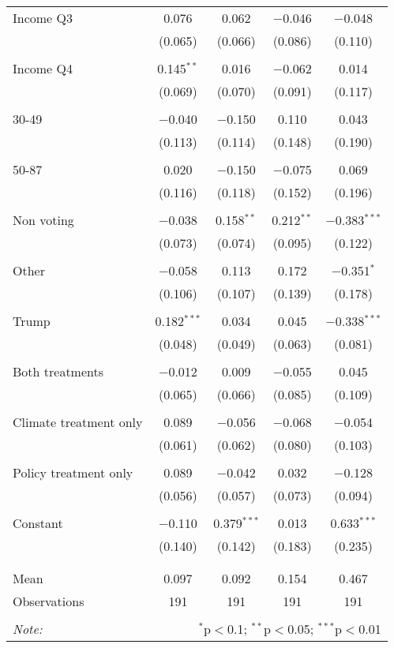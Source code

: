 \begin{tabular}{@{\extracolsep{5pt}}lcccc}
 Income Q3 & 0.076 & 0.062 & $-$0.046 & $-$0.048 \\ 
  & (0.065) & (0.066) & (0.086) & (0.110) \\ 
  & & & & \\ 
 Income Q4 & 0.145$^{**}$ & 0.016 & $-$0.062 & 0.014 \\ 
  & (0.069) & (0.070) & (0.091) & (0.117) \\ 
  & & & & \\ 
 30-49 & $-$0.040 & $-$0.150 & 0.110 & 0.043 \\ 
  & (0.113) & (0.114) & (0.148) & (0.190) \\ 
  & & & & \\ 
 50-87 & 0.020 & $-$0.150 & $-$0.075 & 0.069 \\ 
  & (0.116) & (0.118) & (0.152) & (0.196) \\ 
  & & & & \\ 
 Non voting & $-$0.038 & 0.158$^{**}$ & 0.212$^{**}$ & $-$0.383$^{***}$ \\ 
  & (0.073) & (0.074) & (0.095) & (0.122) \\ 
  & & & & \\ 
 Other & $-$0.058 & 0.113 & 0.172 & $-$0.351$^{*}$ \\ 
  & (0.106) & (0.107) & (0.139) & (0.178) \\ 
  & & & & \\ 
 Trump & 0.182$^{***}$ & 0.034 & 0.045 & $-$0.338$^{***}$ \\ 
  & (0.048) & (0.049) & (0.063) & (0.081) \\ 
  & & & & \\ 
 Both treatments & $-$0.012 & 0.009 & $-$0.055 & 0.045 \\ 
  & (0.065) & (0.066) & (0.085) & (0.109) \\ 
  & & & & \\ 
 Climate treatment only & 0.089 & $-$0.056 & $-$0.068 & $-$0.054 \\ 
  & (0.061) & (0.062) & (0.080) & (0.103) \\ 
  & & & & \\ 
 Policy treatment only & 0.089 & $-$0.042 & 0.032 & $-$0.128 \\ 
  & (0.056) & (0.057) & (0.073) & (0.094) \\ 
  & & & & \\ 
 Constant & $-$0.110 & 0.379$^{***}$ & 0.013 & 0.633$^{***}$ \\ 
  & (0.140) & (0.142) & (0.183) & (0.235) \\ 
  & & & & \\ 
\hline \\[-1.8ex] 
Mean & 0.097 & 0.092 & 0.154 & 0.467 \\ 
Observations & 191 & 191 & 191 & 191 \\ 
\hline 
\hline \\[-1.8ex] 
\textit{Note:}  & \multicolumn{4}{r}{$^{*}$p$<$0.1; $^{**}$p$<$0.05; $^{***}$p$<$0.01} \\ 
\end{tabular} 
